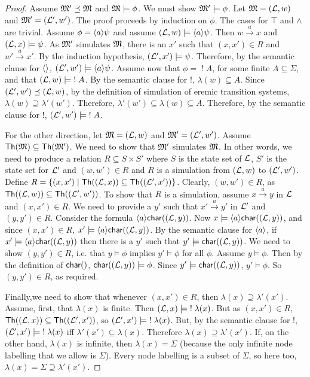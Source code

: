 \begin{proof}
Assume $\frak{M}' \preceq \frak{M}$ and $\frak{M} \models \phi$.  We must show
$\frak{M}' \models \phi$.  Let $\frak{M} = (\mathcal{L}, w)$ and $\frak{M}' = (\mathcal{L}',
w')$.  The proof proceeds by induction on $\phi$.  The cases for
$\top$ and $\land$ are trivial.  Assume $\phi = \langle a \rangle \psi$ and
assume $(\mathcal{L}, w) \models \langle a \rangle \psi$.  Then $w \xrightarrow{a} x$
and $(\mathcal{L}, x) \models \psi$.  As $\frak{M}'$ simulates $\frak{M}$, there is
an $x'$ such that $(x,x') \in R$ and $w' \xrightarrow{a} x'$.  By the
induction hypothesis, $(\mathcal{L}', x') \models \psi$.  Therefore, by the
semantic clause for $\MAY{}$, $(\mathcal{L}', w') \models \langle a \rangle \psi$.  Assume
now that $\phi = \; ! \; A$, for some finite $A \subseteq \Sigma$, and
that $(\mathcal{L}, w) \models \; ! \; A$.  By the semantic clause for $!$,
$\lambda(w) \subseteq A$.  Since $(\mathcal{L}', w') \preceq (\mathcal{L}, w)$, by
the definition of simulation of eremic transition systems, $\lambda(w)
\supseteq \lambda'(w')$.  Therefore, $\lambda'(w') \subseteq
\lambda(w) \subseteq A$.  Therefore, by the semantic clause for $!$,
$(\mathcal{L}', w') \models \; ! \; A$.

For the other direction, let $\frak{M} = (\mathcal{L}, w)$ and $\frak{M}' = (\mathcal{L}',
w')$.  Assume $\mathsf{Th}(\frak{M}) \subseteq \mathsf{Th}(\frak{M}') $. We need to
show that $\frak{M}'$ simulates $\frak{M}$.  In other words, we need to
produce a relation $R \subseteq S \times S'$ where $S$ is the state
set of $\mathcal{L}$, $S'$ is the state set for $\mathcal{L}'$ and $(w,w') \in R$
and $R$ is a simulation from $(\mathcal{L}, w)$ to $ (\mathcal{L}', w')$.  Define $R
= \{(x,x') \; | \; \mathsf{Th}( (\mathcal{L}, x)) \subseteq \mathsf{Th}( (\mathcal{L}',
  x'))\}$.  Clearly, $(w,w') \in R$, as $\mathsf{Th}((\mathcal{L}, w)) \subseteq
\mathsf{Th}((\mathcal{L}', w')) $.  To show that $R$ is a simulation, assume $x
\xrightarrow{a} y$ in $\mathcal{L}$ and $(x,x') \in R$. 
We need to provide a
$y'$ such that $x' \xrightarrow{a} y'$ in $\mathcal{L}'$ and $(y,y') \in R$.  
Consider the formula $\langle a \rangle \mathsf{char}((\mathcal{L}, y))$. 
Now $x \models \langle a \rangle \mathsf{char}((\mathcal{L}, y))$, and since $(x,x') \in R$, $x' \models \langle a \rangle \mathsf{char}((\mathcal{L}, y))$.
By the semantic clause for $\MAY{a}$, if $x' \models \langle a \rangle \mathsf{char}((\mathcal{L}, y))$ then there is a $y'$ such that 
$y' \models \mathsf{char}((\mathcal{L}, y))$.
We need to show $(y,y') \in R$, i.e. that $y \models \phi$ implies $y' \models \phi$ for all $\phi$.
Assume $y \models \phi$. 
Then by the definition of $\CHAR$, $\mathsf{char}((\mathcal{L}, y)) \models \phi$.
Since $y' \models \mathsf{char}((\mathcal{L}, y))$, $y' \models \phi$. 
So $(y,y') \in R$, as required.

Finally,we need to show that whenever $(x,x') \in R$, then $\lambda(x)
\supseteq \lambda'(x')$.  Assume, first, that $\lambda(x)$ is finite.
Then $(\mathcal{L}, x) \models \; ! \; \lambda(x)$.  But as $(x,x') \in R$,
$\mathsf{Th}((\mathcal{L}, x)) \subseteq \mathsf{Th}((\mathcal{L}', x')) $, so $(\mathcal{L}', x')
\models \; ! \; \lambda(x)$.  But, by the semantic clause for $!$,
$(\mathcal{L}', x') \models \; ! \; \lambda(x)$ iff $\lambda'(x') \subseteq
\lambda(x)$.  Therefore $\lambda(x) \supseteq \lambda'(x')$.  If, on
the other hand, $\lambda(x)$ is infinite, then $\lambda(x) = \Sigma$
(because the only infinite node labelling that we allow is
$\Sigma$). Every node labelling is a subset of $\Sigma$, so here too,
$\lambda(x) = \Sigma \supseteq \lambda'(x')$.  
\end{proof}

